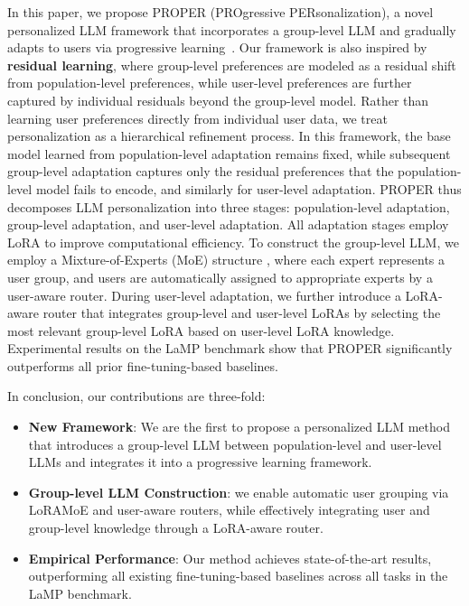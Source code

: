 \documentclass[11pt]{article}
\begin{document}
In this paper, we propose PROPER (PROgressive PERsonalization), a novel personalized LLM framework that incorporates a group-level LLM and gradually adapts to users via progressive learning~\cite{fayek2020progressive}. 
Our framework is also inspired by \textbf{residual learning}, where group-level preferences are modeled as a residual shift from population-level preferences, while user-level preferences are further captured by individual residuals beyond the group-level model.
Rather than learning user preferences directly from individual user data, we treat personalization as a hierarchical refinement process.
In this framework, the base model learned from population-level adaptation remains fixed, while subsequent group-level adaptation captures only the residual preferences that the population-level model fails to encode, and similarly for user-level adaptation. 
PROPER thus decomposes LLM personalization into three stages: population-level adaptation, group-level adaptation, and user-level adaptation. 
All adaptation stages employ LoRA to improve computational efficiency.
To construct the group-level LLM, we employ a Mixture-of-Experts (MoE) structure \cite{dou-etal-2024-loramoe}, where each expert represents a user group, and users are automatically assigned to appropriate experts by a user-aware router. 
During user-level adaptation, we further introduce a LoRA-aware router that integrates group-level and user-level LoRAs by selecting the most relevant group-level LoRA based on user-level LoRA knowledge.
Experimental results on the LaMP benchmark show that PROPER significantly outperforms all prior fine-tuning-based baselines.

In conclusion, our contributions are three-fold:
\begin{itemize}
    \item \textbf{New Framework}: We are the first to propose a personalized LLM method that introduces a group-level LLM between population-level and user-level LLMs and integrates it into a progressive learning framework. 
    \item \textbf{Group-level LLM Construction}: we enable automatic user grouping via LoRAMoE and user-aware routers, while effectively integrating user and group-level knowledge through a LoRA-aware router.
    \item \textbf{Empirical Performance}: Our method achieves state-of-the-art results, outperforming all existing fine-tuning-based baselines across all tasks in the LaMP benchmark.
\end{itemize}
\end{document}
